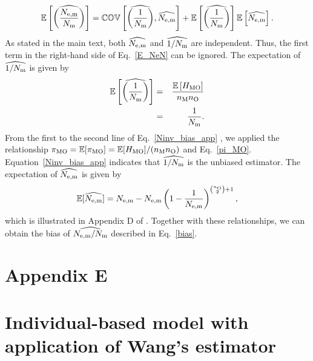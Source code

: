\documentclass[12pt, English]{article}
\begin{document}
\begin{spacing}{1.9}
\begin{equation}
\mathbb{E}\left[\widehat{\left(\frac{N_{\rm e,m}}{N_{\rm m}}\right) }\right] = \mathbb{COV}\left[\widehat{\left(\frac{1}{N_{\rm m}}\right)}, \widehat{N_{\rm e,m}} \right] + \mathbb{E}\left[\widehat{\left(\frac{1}{N_{\rm m}}\right)}\right] \mathbb{E}\left[ \widehat{N_{\rm e,m}} \right].
\label{E_NeN}
\end{equation}
As stated in the main text, both $\widehat{N_{\rm e,m}}$ and $\widehat{1/N_{\rm m}}$ are independent. Thus, the first term in the right-hand side of Eq.~\ref{E_NeN} can be ignored. The expectation of $\widehat{1/N_{\rm m}}$ is given by
\begin{eqnarray}
 \mathbb{E}\left[\widehat{\left(\frac{1}{N_{\rm m}}\right)}\right] &=& \frac{\mathbb{E}\left[ H_{\rm MO}\right]}{n_{\rm M}n_{\rm O}}\nonumber\\
 &=& \frac{1}{N_{\rm m}}.
 \label{Ninv_bias_app}
\end{eqnarray}
From the first to the second line of Eq.~\ref{Ninv_bias_app} , we applied the relationship $\pi_{\rm MO} = \mathbb{E}[\pi_{\rm MO}] = \mathbb{E}[H_{\rm MO}]/(n_{\rm M}n_{\rm O})$ and Eq.~\ref{pi_MO}. Equation~\ref{Ninv_bias_app} indicates that $\widehat{1/N_{\rm m}}$ is the unbiased estimator. The expectation of $\widehat{N_{\rm e,m}}$ is given by
\begin{equation}
\mathbb{E}[\widehat{N_{\rm e,m}}] = N_{\rm e,m} - N_{\rm e,m}\left(1-\frac{1}{N_{\rm e,m}}\right)^{\binom{n_{\rm O}}{2}+1},
\label{bias_Ne}
\end{equation}
which is illustrated in Appendix D of \cite{Akita_2019}. Together with these relationships, we can obtain the bias of $\widehat{N_{\rm e,m}/N_{\rm m}}$ described in Eq.~\ref{bias}.
 
\section*{Appendix E}
\setcounter{equation}{0}
\section*{Individual-based model with application of Wang's estimator}
\renewcommand{\theequation}{E\arabic{equation}}


\end{spacing}
\end{document}
